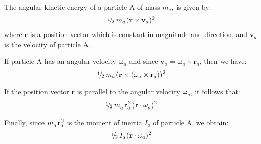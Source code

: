 \documentclass[10pt]{article}
\newcommand{\mM}{m}
\newcommand{\mI}{I}
\newcommand{\ra}{_a}
\newcommand{\vR}{\mathbf{r}}
\newcommand{\vV}{\mathbf{v}}
\newcommand{\aV}{\mathbf{\omega}}
\newcommand{\med}{\raise.5ex\hbox{$\scriptstyle 1$}\kern-.15em/\kern-.15em\lower.25ex\hbox{$\scriptstyle 2$}}
\begin{document}
\par The angular kinetic energy of a particle A of mass $\mM\ra$, is given by:
\begin{eqnarray*}
\med \hspace{+0.24em} \mM\ra \hspace{+0.06em} (\hspace{+0.03em} \vR \times \vV\ra)^{\hspace{+0.03em} 2}
\end{eqnarray*}
\noindent where $\vR$ is a position vector which is constant in magnitude and direction, and $\vV\ra$ is the velocity of particle A.
\medskip
\par If particle A has an angular velocity $\aV\ra$ and since $\vV\ra = \aV\ra \times \vR\ra$, then we have:
\begin{eqnarray*}
\med \hspace{+0.24em} \mM\ra \hspace{+0.06em} (\hspace{+0.03em} \vR \times (\aV\ra \times \vR\ra))^{\hspace{+0.03em} 2}
\end{eqnarray*}
\par If the position vector $\vR$ is parallel to the angular velocity $\aV\ra$, it follows that:
\begin{eqnarray*}
\med \hspace{+0.24em} \mM\ra^{\vphantom{2}} \hspace{+0.06em} \vR\ra^{\hspace{+0.09em} 2} \hspace{+0.09em} (\hspace{+0.03em} \vR \cdot \aV\ra^{\vphantom{2}})^{\hspace{+0.03em} 2}
\end{eqnarray*}
\par Finally, since $\mM\ra^{\vphantom{2}} \hspace{+0.06em} \vR\ra^{\hspace{+0.09em} 2}$ is the moment of inertia $\mI\ra$ of particle A, we obtain:
\begin{eqnarray*}
\med \hspace{+0.24em} \mI\ra \hspace{+0.06em} (\hspace{+0.03em} \vR \cdot \aV\ra)^{\hspace{+0.03em} 2}
\end{eqnarray*}
\end{document}
